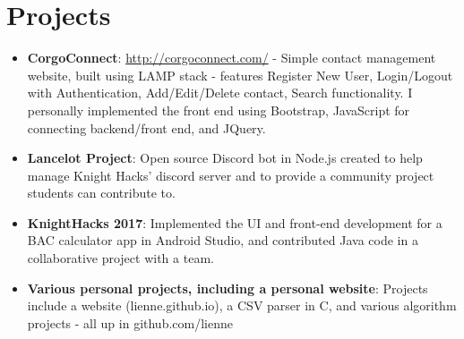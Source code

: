 \documentclass[letterpaper,11pt]{article}
\newcommand{\resumeItem}[2]{
  \item\small{
    \textbf{#1}{: #2 \vspace{-2pt}}
  }
}
\newcommand{\resumeSubItem}[2]{\resumeItem{#1}{#2}\vspace{-4pt}}
\newcommand{\resumeSubHeadingListStart}{\begin{itemize}[leftmargin=*]}
\newcommand{\resumeSubHeadingListEnd}{\end{itemize}}
\begin{document}
\section{Projects}
  \resumeSubHeadingListStart
    \resumeSubItem{CorgoConnect}
      {\url{http://corgoconnect.com/} - Simple contact management website, built using LAMP stack - features Register New User, Login/Logout with Authentication, Add/Edit/Delete contact, Search functionality. I personally implemented the front end using Bootstrap, JavaScript for connecting backend/front end, and JQuery.}
    \resumeSubItem{Lancelot Project}
      {Open source Discord bot in Node.js created to help manage Knight Hacks' discord server and to provide a community project students can contribute to.}
    \resumeSubItem{KnightHacks 2017}
      {Implemented the UI and front-end development for a BAC calculator app in Android Studio, and contributed Java code in a collaborative project with a team.}
    \resumeSubItem{Various personal projects, including a personal website}
      {Projects include a website (lienne.github.io), a CSV parser in C, and various algorithm projects - all up in github.com/lienne}
  \resumeSubHeadingListEnd
    
    
\end{document}
